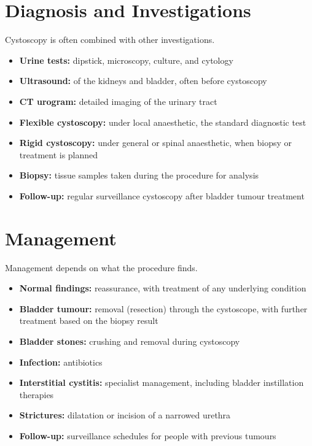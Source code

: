 \section*{Diagnosis and Investigations}
Cystoscopy is often combined with other investigations.

\begin{itemize}
    \item \textbf{Urine tests:} dipstick, microscopy, culture, and cytology
    \item \textbf{Ultrasound:} of the kidneys and bladder, often before cystoscopy
    \item \textbf{CT urogram:} detailed imaging of the urinary tract
    \item \textbf{Flexible cystoscopy:} under local anaesthetic, the standard diagnostic test
    \item \textbf{Rigid cystoscopy:} under general or spinal anaesthetic, when biopsy or treatment is planned
    \item \textbf{Biopsy:} tissue samples taken during the procedure for analysis
    \item \textbf{Follow-up:} regular surveillance cystoscopy after bladder tumour treatment
\end{itemize}

\section*{Management}
Management depends on what the procedure finds.

\begin{itemize}
    \item \textbf{Normal findings:} reassurance, with treatment of any underlying condition
    \item \textbf{Bladder tumour:} removal (resection) through the cystoscope, with further treatment based on the biopsy result
    \item \textbf{Bladder stones:} crushing and removal during cystoscopy
    \item \textbf{Infection:} antibiotics
    \item \textbf{Interstitial cystitis:} specialist management, including bladder instillation therapies
    \item \textbf{Strictures:} dilatation or incision of a narrowed urethra
    \item \textbf{Follow-up:} surveillance schedules for people with previous tumours
\end{itemize}

